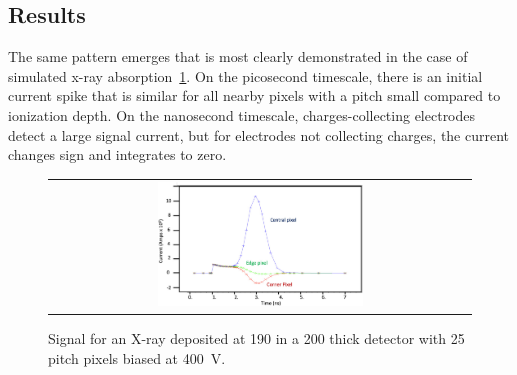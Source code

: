\begin{refsection}
\section{Results}
The same pattern emerges that is most clearly demonstrated in the case of simulated x-ray absorption~\ref{Signal_xray}.
On the picosecond timescale, there is an initial current spike that is similar for all nearby pixels with a pitch small compared to ionization depth.
On the nanosecond timescale, charges-collecting electrodes detect a large signal current, but for electrodes not collecting charges, the current changes sign and integrates to zero.
\begin{figure}[htb]
  \begin{center}
    \begin{tabular}{c}
      \includegraphics[width=0.50\textwidth]{fig_FastTiming/Signal_xray.png}
    \end{tabular}
    \caption{Signal for an X-ray deposited at \SI{190}{\micron} in a \SI{200}{\micron} thick detector with \SI{25}{\micron} pitch pixels biased at \SI{400}{\V}.
            }
    \label{Signal_xray}
  \end{center}
\end{figure}


\end{refsection}

